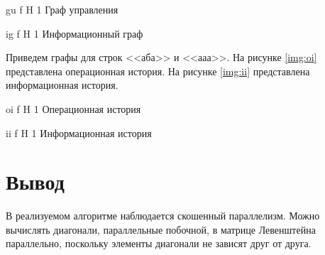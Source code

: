 {gu} %
{f} %
{H} %
{1\textwidth} %
{Граф управления} %


{ig} %
{f} %
{H} %
{1\textwidth} %
{Информационный граф} %


Приведем графы для строк <<аба>> и <<ааа>>. На рисунке \ref{img:oi} представлена операционная история. На рисунке \ref{img:ii} представлена информационная история.

{oi} %
{f} %
{H} %
{1\textwidth} %
{Операционная история} %


{ii} %
{f} %
{H} %
{1\textwidth} %
{Информационная история} %

\section*{Вывод}

В реализуемом алгоритме наблюдается скошенный параллелизм. Можно вычислять диагонали, параллельные побочной, в матрице Левенштейна параллельно, поскольку элементы диагонали не зависят друг от друга.
